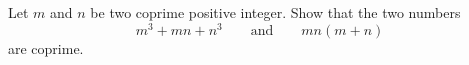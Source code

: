 Let $m$ and $n$ be two coprime positive integer. Show that the two numbers
$$m^3+mn+n^3 \qquad \text{and} \qquad mn(m+n)$$
are coprime.
